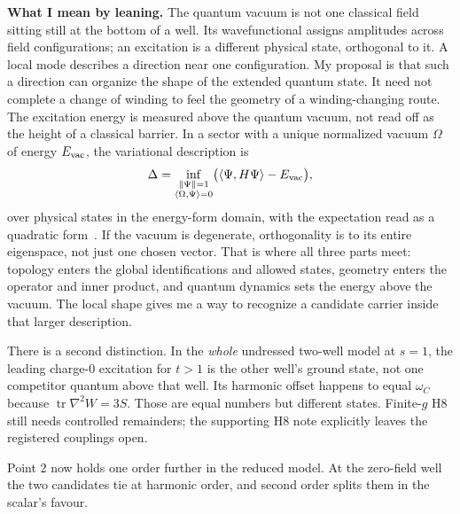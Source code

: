 \textbf{What I mean by leaning.} The quantum vacuum is not one classical field sitting still at the bottom of a well.
Its wavefunctional assigns amplitudes across field configurations; an excitation is a different physical state,
orthogonal to it. A local mode describes a direction near one configuration. My proposal is that such a direction
can organize the shape of the extended quantum state. It need not complete a change of winding to feel the geometry
of a winding-changing route. The excitation energy is measured above the quantum vacuum, not read off as the height
of a classical barrier. In a sector with a unique normalized vacuum $\Omega$ of energy $E_{\rm vac}$, the variational description is
\begin{equation}\label{eq:gap}
 \Delta=\inf_{\substack{\|\Psi\|=1\\ \langle\Omega,\Psi\rangle=0}}
 \bigl(\langle\Psi,H\Psi\rangle-E_{\rm vac}\bigr),
\end{equation}
over physical states in the energy-form domain, with the expectation read as a quadratic form~\cite{ReedSimonIV}.
If the vacuum is degenerate, orthogonality is to its entire eigenspace, not just one chosen vector.
That is where all three parts meet: topology enters the global identifications and allowed states, geometry enters
the operator and inner product, and quantum dynamics sets the energy above the vacuum. The local shape gives me a
way to recognize a candidate carrier inside that larger description.

There is a second distinction. In the \emph{whole} undressed two-well model at $s=1$, the leading charge-0 excitation
for $t>1$ is the other well's ground state, not one competitor quantum above that well. Its harmonic offset happens
to equal $\omega_C$ because $\operatorname{tr}\nabla^2W=3S$. Those are equal numbers but different states.
Finite-$g$ H8 still needs controlled remainders; the supporting H8 note explicitly leaves the registered couplings open.

Point 2 now holds one order further in the reduced model. At the zero-field well the two candidates tie at harmonic
order, and second order splits them in the scalar's favour.

